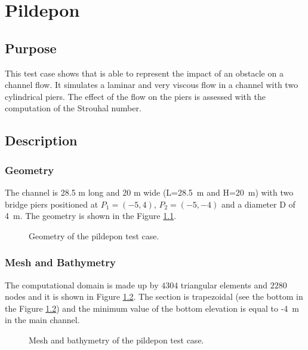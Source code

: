 \chapter{Pildepon}
%
%
\section{Purpose}

This test case shows that  is able to represent the impact of an obstacle on a channel flow.
It simulates a laminar and very viscous flow in a channel with two cylindrical piers. The effect of the flow
on the piers is assessed with the computation of the Strouhal number.

\section{Description}

\subsection{Geometry}

The channel is 28.5 m long and 20 m wide (L=28.5~m and H=20~m) with two bridge piers positioned at $P_1=(-5,4)$, $P_2=(-5,-4)$ and a diameter D of 4~m.
The geometry is shown in the Figure \ref{fig:geo:bridge}.

\begin{figure}[H]
 \centering
 \caption{Geometry of the pildepon test case.}
 \label{fig:geo:bridge}
\end{figure}

\subsection{Mesh and Bathymetry}

The computational domain is made up by $4304$ triangular elements and $2280$ nodes and it is shown in Figure \ref{fig:mesh:bridge}.
The section is trapezoidal (see the bottom in the Figure \ref{fig:mesh:bridge}) and the minimum value of the bottom elevation is equal to -4~m in the main channel.

\begin{figure}[H]
\begin{minipage}[t]{0.45\textwidth}
 \centering
\end{minipage}%
\begin{minipage}[t]{0.55\textwidth}
 \centering
\end{minipage}
 \caption{Mesh and bathymetry of the pildepon test case.}
 \label{fig:mesh:bridge}
\end{figure}

